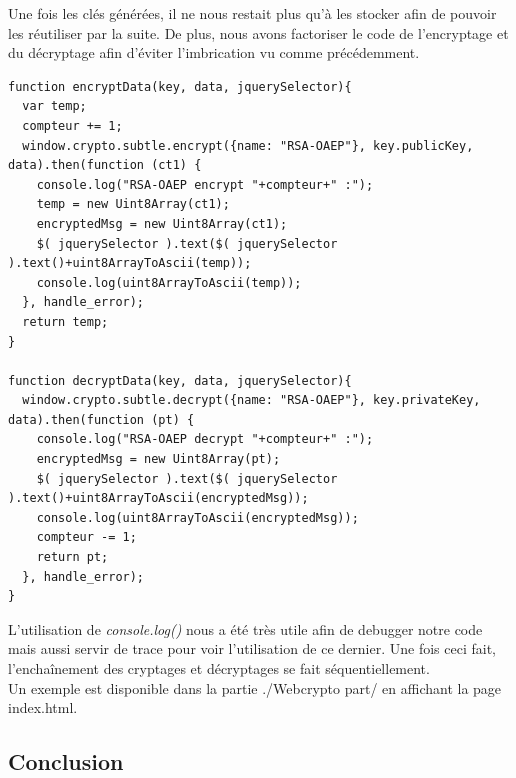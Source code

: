\documentclass[a4paper,12pt]{report}
\begin{document}
	Une fois les clés générées, il ne nous restait plus qu'à les stocker afin de pouvoir les réutiliser par la suite. De plus, nous avons factoriser le code de l'encryptage et du décryptage afin d'éviter l'imbrication vu comme précédemment. 
		\begin{lstlisting}
function encryptData(key, data, jquerySelector){
  var temp;
  compteur += 1;
  window.crypto.subtle.encrypt({name: "RSA-OAEP"}, key.publicKey, data).then(function (ct1) {
    console.log("RSA-OAEP encrypt "+compteur+" :");
    temp = new Uint8Array(ct1);
    encryptedMsg = new Uint8Array(ct1);
    $( jquerySelector ).text($( jquerySelector ).text()+uint8ArrayToAscii(temp));
    console.log(uint8ArrayToAscii(temp));
  }, handle_error);
  return temp;
}

function decryptData(key, data, jquerySelector){
  window.crypto.subtle.decrypt({name: "RSA-OAEP"}, key.privateKey, data).then(function (pt) {
    console.log("RSA-OAEP decrypt "+compteur+" :");
    encryptedMsg = new Uint8Array(pt);
    $( jquerySelector ).text($( jquerySelector ).text()+uint8ArrayToAscii(encryptedMsg));
    console.log(uint8ArrayToAscii(encryptedMsg));
    compteur -= 1;
    return pt;
  }, handle_error);
}	
	\end{lstlisting}
	L'utilisation de \textit{console.log()} nous a été très utile afin de debugger notre code mais aussi servir de trace pour voir l'utilisation de ce dernier. Une fois ceci fait, l'enchaînement des cryptages et décryptages se fait séquentiellement.\\
	Un exemple est disponible dans la partie ./Webcrypto part/ en affichant la page index.html.

\newpage	
\begin{center}
\section*{Conclusion}
\end{center}
\end{document}
